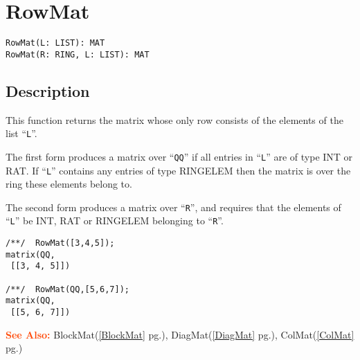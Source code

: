 \documentclass[a4paper]{mybook}
\newenvironment{command}{}{} %
\newcommand\SeeAlso{\par\textcolor{OrangeRed}{\textbf{\large See Also: }}}
\begin{document}
\section{RowMat}
\label{RowMat}
\begin{command} %


\begin{Verbatim}[label=syntax, rulecolor=\color{MidnightBlue},
frame=single]
RowMat(L: LIST): MAT
RowMat(R: RING, L: LIST): MAT
\end{Verbatim}


\subsection*{Description}

This function returns the matrix whose only row consists of the
elements of the list ``\verb&L&''.
\par 
The first form produces a matrix over ``\verb&QQ&'' if all entries in
``\verb&L&'' are of type INT or RAT.  If ``\verb&L&'' contains any entries
of type RINGELEM then the matrix is over the ring these elements
belong to.
\par 
The second form produces a matrix over ``\verb&R&'', and requires that
the elements of ``\verb&L&'' be INT, RAT or RINGELEM belonging to ``\verb&R&''.
\begin{Verbatim}[label=example, rulecolor=\color{PineGreen}, frame=single]
/**/  RowMat([3,4,5]);
matrix(QQ,
 [[3, 4, 5]])

/**/  RowMat(QQ,[5,6,7]);
matrix(QQ,
 [[5, 6, 7]])
\end{Verbatim}


\SeeAlso %
  BlockMat(\ref{BlockMat} pg.\pageref{BlockMat}), 
    DiagMat(\ref{DiagMat} pg.\pageref{DiagMat}), 
    ColMat(\ref{ColMat} pg.\pageref{ColMat})
\end{command} %
\end{document}
